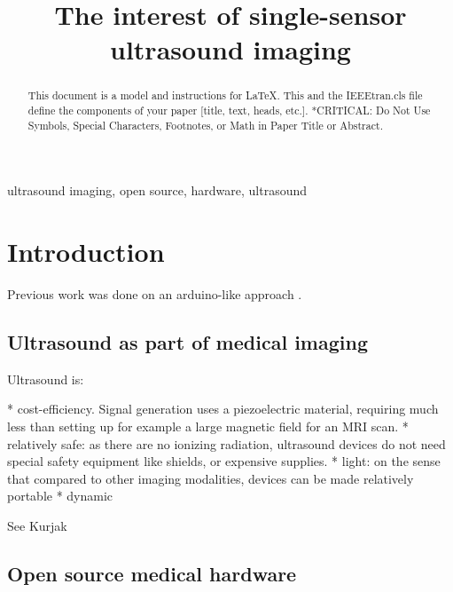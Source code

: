 \documentclass[conference]{IEEEtran}
\begin{document}
\title{The interest of single-sensor ultrasound imaging}

\author{

}

\maketitle

\begin{abstract}
This document is a model and instructions for \LaTeX.
This and the IEEEtran.cls file define the components of your paper [title, text, heads, etc.]. *CRITICAL: Do Not Use Symbols, Special Characters, Footnotes, 
or Math in Paper Title or Abstract.
\end{abstract}

\begin{IEEEkeywords}
ultrasound imaging, open source, hardware, ultrasound
\end{IEEEkeywords}

\section{Introduction}


 
 
Previous work was done on an arduino-like approach \cite{jonveaux_arduino-like_2017}.

\subsection{Ultrasound as part of medical imaging }

Ultrasound is:

* cost-efficiency. Signal generation uses a piezoelectric material, requiring much less than setting up for example a large magnetic field for an MRI scan. 
* relatively safe: as there are no ionizing radiation, ultrasound devices do not need special safety equipment like shields, or expensive supplies.
* light: on the sense that compared to other imaging modalities, devices can be made relatively portable
* dynamic


See Kurjak



\subsection{Open source medical hardware}
\end{document}
